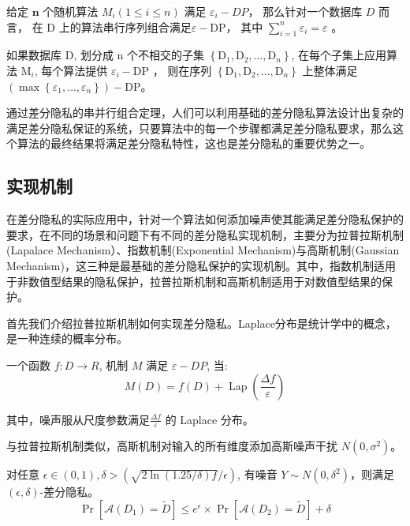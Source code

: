 \begin{theorem}[串行组合]\label{串行组合}
给定 $\mathbf{n}$ 个随机算法 $M_{i}(1 \leq i \leq n)$ 满足 $\varepsilon_{i}-DP$， 那么针对一个数据库 $D$ 而言， 在 $\mathrm{D}$ 上的算法串行序列组合满足$\varepsilon-\mathrm{DP}$， 其中 $\sum_{i=1}^{n} \varepsilon_{i}=\varepsilon$ 。
\end{theorem}

\begin{theorem}[并行组合]\label{并行组合}
如果数据库 $\mathrm{D}$, 划分成 $\mathrm{n}$ 个不相交的子集 $\left\{\mathrm{D}_{1}, \mathrm{D}_{2}, \ldots, \mathrm{D}_{n}\right\}$, 在每个子集上应用算法 $\mathrm{M}_{i}$, 每个算法提供 $\varepsilon_{i}-\mathrm{DP}$ ， 则在序列 $\left\{\mathrm{D}_{1}, \mathrm{D}_{2}, \ldots, \mathrm{D}_{n}\right\}$ 上整体满足 $\left(\max \left\{\varepsilon_{1}, \ldots, \varepsilon_{n}\right\}\right)-\mathrm{DP}$。
\end{theorem}

通过差分隐私的串并行组合定理，人们可以利用基础的差分隐私算法设计出复杂的满足差分隐私保证的系统，只要算法中的每一个步骤都满足差分隐私要求，那么这个算法的最终结果将满足差分隐私特性，这也是差分隐私的重要优势之一。 

\subsection{实现机制}
在差分隐私的实际应用中，针对一个算法如何添加噪声使其能满足差分隐私保护的要求，在不同的场景和问题下有不同的差分隐私实现机制，主要分为拉普拉斯机制(Lapalace Mechanism）、指数机制(Exponential Mechanism)与高斯机制(Gaussian Mechanism)，这三种是最基础的差分隐私保护的实现机制。其中，指数机制适用于非数值型结果的隐私保护，拉普拉斯机制和高斯机制适用于对数值型结果的保护。

首先我们介绍拉普拉斯机制如何实现差分隐私。Laplace分布是统计学中的概念，是一种连续的概率分布。

\begin{theorem}[拉普拉斯机制]\label{拉普拉斯机制}
一个函数 $f: D \rightarrow R$, 机制 $M$ 满足 $\varepsilon-D P$, 当:
$$
M(D)=f(D)+\operatorname{Lap}\left(\frac{\Delta f}{\varepsilon}\right)
$$
\end{theorem}
其中，噪声服从尺度参数满足$\frac{\Delta f}{\varepsilon}$ 的 Laplace 分布。

与拉普拉斯机制类似，高斯机制对输入的所有维度添加高斯噪声干扰 $N\left(0,\sigma^{2}\right)$。
\begin{theorem}[高斯机制]\label{高斯机制}
对任意 $\epsilon \in(0,1), \delta>(\sqrt{2 \ln (1.25 / \delta) f} / \epsilon)$, 有噪音 $Y \sim N\left(0, \delta^{2}\right)$，则满足 $(\epsilon, \delta)$-差分隐私。
$$
\operatorname{Pr}\left[\mathscr{A}\left(D_{1}\right)=\tilde{D}\right] \leq e^{\epsilon} \times \operatorname{Pr}\left[\mathscr{A}\left(D_{2}\right)=\tilde{D}\right]+\delta
$$
\end{theorem}


